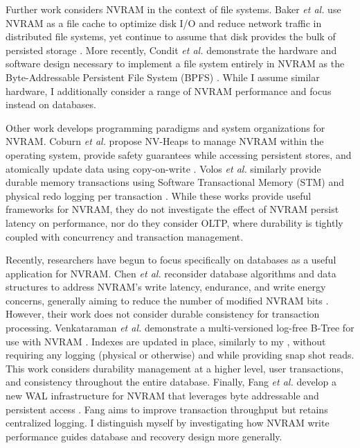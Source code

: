 Further work considers NVRAM in the context of file systems.
Baker \emph{et al.} use NVRAM as a file cache to optimize disk I/O and reduce network traffic in distributed file systems, yet continue to assume that disk provides the bulk of persisted storage \cite{BakerAsami92}.
More recently, Condit \emph{et al.} demonstrate the hardware and software design necessary to implement a file system entirely in NVRAM as the Byte-Addressable Persistent File System (BPFS) \cite{ConditNightingale09}.
While I assume similar hardware, I additionally consider a range of NVRAM performance and focus instead on databases.

Other work develops programming paradigms and system organizations for NVRAM.
Coburn \emph{et al.} propose NV-Heaps to manage NVRAM within the operating system, provide safety guarantees while accessing persistent stores, and atomically update data using copy-on-write \cite{CoburnCaulfield11}.
Volos \emph{et al.} similarly provide durable memory transactions using Software Transactional Memory (STM) and physical redo logging per transaction \cite{VolosTack11}.
While these works provide useful frameworks for NVRAM, they do not investigate the effect of NVRAM persist latency on performance, nor do they consider OLTP, where durability is tightly coupled with concurrency and transaction management.

Recently, researchers have begun to focus specifically on databases as a useful application for NVRAM.
Chen \emph{et al.} reconsider database algorithms and data structures to address NVRAM's write latency, endurance, and write energy concerns, generally aiming to reduce the number of modified NVRAM bits \cite{ChenGibbons11}.
However, their work does not consider durable consistency for transaction processing.
Venkataraman \emph{et al.} demonstrate a multi-versioned log-free B-Tree for use with NVRAM \cite{VenkataramanTolia11}.
Indexes are updated in place, similarly to my \InPlace, without requiring any logging (physical or otherwise) and while providing snap shot reads.
This work considers durability management at a higher level, user transactions, and consistency throughout the entire database.
Finally, Fang \emph{et al.} develop a new WAL infrastructure for NVRAM that leverages byte addressable and persistent access \cite{FangHsiao11}.
Fang aims to improve transaction throughput but retains centralized logging.
I distinguish myself by investigating how NVRAM write performance guides database and recovery design more generally.

